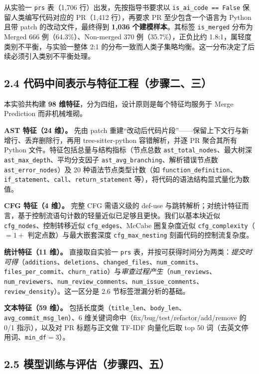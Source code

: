 \documentclass{experimentreport}
\begin{document}
{从实验一 \texttt{prs} 表（1{,}706 行）出发，先按指导书要求以 \texttt{is\_ai\_code == False} 保留人类编写代码对应的 PR（1{,}412 行），再要求 PR 至少包含一个语言为 Python 且带 patch 的改动文件，最终得到 \textbf{1{,}036 个建模样本}。其标签 \texttt{is\_merged} 分布为 Merged 666 例（64.3\%）、Non-merged 370 例（35.7\%），正负比约 1.8:1，属轻度类别不平衡，与实验一整体 2:1 的分布一致而人类子集略均衡。这一分布决定了后续必须引入类别不平衡处理。

\subsection*{2.4 代码中间表示与特征工程（步骤二、三）}

本实验共构建 \textbf{98 维特征}，分为四组，设计原则是每个特征均服务于 Merge Prediction 而非机械堆砌。

\textbf{AST 特征（24 维）。} 先由 patch 重建“改动后代码片段”——保留上下文行与新增行、丢弃删除行，再用 tree-sitter-python 容错解析，并逐 PR 聚合其所有 Python 文件。特征包括总量与结构指标（节点总数 \texttt{ast\_total\_nodes}、最大树深 \texttt{ast\_max\_depth}、平均分支因子 \texttt{ast\_avg\_branching}、解析错误节点数 \texttt{ast\_error\_nodes}）及 20 种语法节点类型计数（如 \texttt{function\_definition}、\texttt{if\_statement}、\texttt{call}、\texttt{return\_statement} 等），将代码的语法结构显式量化为数值。

\textbf{CFG 特征（4 维）。} 完整 CFG 需语义级的 def-use 与跳转解析；对统计特征而言，基于控制流语句计数的轻量近似已足够且更快。我们以基本块近似 \texttt{cfg\_nodes}、控制转移近似 \texttt{cfg\_edges}、McCabe 圈复杂度近似 \texttt{cfg\_complexity}（$=1+$ 判定点数）与最大嵌套深度 \texttt{cfg\_max\_nesting} 刻画代码的控制流复杂度。

\textbf{统计特征（11 维）。} 直接取自实验一 \texttt{prs} 表，并按可获得时间分为两类：\emph{提交时可得}（\texttt{additions}、\texttt{deletions}、\texttt{changed\_files}、\texttt{num\_commits}、\texttt{files\_per\_commit}、\texttt{churn\_ratio}）与\emph{审查过程产生}（\texttt{num\_reviews}、\texttt{num\_reviewers}、\texttt{num\_review\_comments}、\texttt{num\_issue\_comments}、\texttt{review\_density}）。这一区分是 2.6 节标签泄漏分析的基础。

\textbf{文本特征（59 维）。} 包括长度类（\texttt{title\_len}、\texttt{body\_len}、\texttt{avg\_commit\_msg\_len}）、6 维关键词命中（fix/bug/test/refactor/add/remove 的 0/1 指示），以及对 PR 标题与正文做 TF-IDF 向量化后取 top 50 词（去英文停用词、\texttt{min\_df}$=3$）。

\subsection*{2.5 模型训练与评估（步骤四、五）}

}
\end{document}
